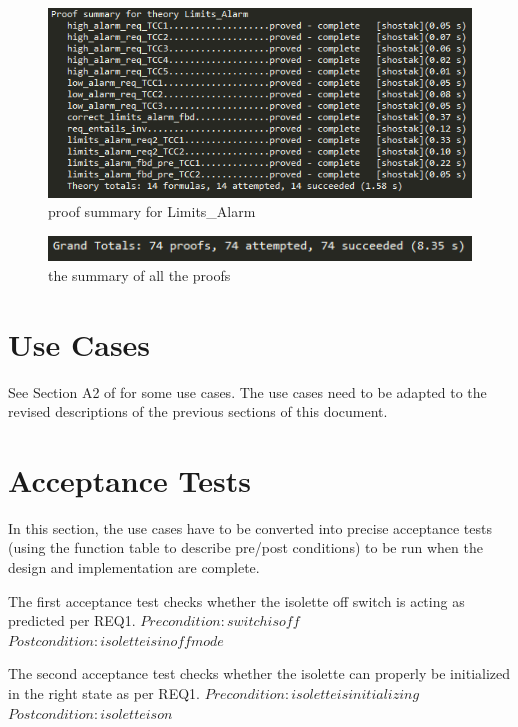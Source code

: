 \documentclass[fontsize=12pt,paper=letter,twoside]{scrartcl}
\begin{document}
\begin{figure}[!htb]
\begin{center}
\includegraphics[width=.8\textwidth]{pics/prf_Limits_Alarm.png}
\end{center}
\caption{proof summary for Limits\_Alarm}
\label{fig:LimitsAlarm}
\end{figure}

\begin{figure}[!htb]
\begin{center}
\includegraphics[width=.8\textwidth]{pics/prf_all.png}
\end{center}
\caption{the summary of all the proofs}
\label{fig:prfall}
\end{figure}

\section{Use Cases}
See Section A2 of \cite{REMH} for some use cases. The use cases need to be adapted to the revised descriptions of the previous sections of this document.

\section{Acceptance Tests}
In this section, the use cases have to be converted into precise acceptance tests (using the function table to describe pre/post conditions) to be run when the design and implementation are complete.

\noindent The first acceptance test checks whether the isolette off switch is acting as predicted per REQ1.
$Precondition: switch is off$
$Postcondition: isolette is in off mode$

\noindent The second acceptance test checks whether the isolette can properly be initialized in the right state as per REQ1.
$Precondition: isolette is initializing$
$Postcondition: isolette is on$
\end{document}
